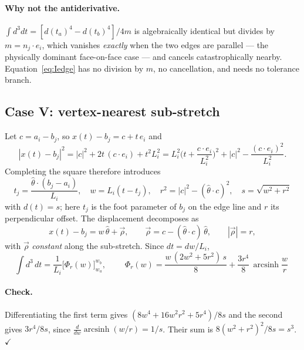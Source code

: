 \documentclass[11pt]{article}
\newcommand{\asinh}{\operatorname{arcsinh}}
\newcommand{\that}{\hat\theta}
\newcommand{\rvec}{\vec\rho}
\begin{document}
\paragraph{Why not the antiderivative.} $\int d^3dt = [d(t_a)^4 - d(t_b)^4]/4m$ is algebraically identical but divides by $m = n_j\cdot e_i$, which vanishes \emph{exactly} when the two edges are parallel --- the physically dominant face-on-face case --- and cancels catastrophically nearby. Equation~\eqref{eq:Iedge} has no division by $m$, no cancellation, and needs no tolerance branch.

\subsection{Case V: vertex-nearest sub-stretch}

Let $c = a_i - b_j$, so $x(t)-b_j = c + t\,e_i$ and
\begin{equation}
|x(t)-b_j|^2 = |c|^2 + 2t\,(c\cdot e_i) + t^2L_i^2
= L_i^2\Big(t + \frac{c\cdot e_i}{L_i^2}\Big)^2 + |c|^2 - \frac{(c\cdot e_i)^2}{L_i^2}.
\end{equation}
Completing the square therefore introduces
\begin{equation}
\boxed{\;t_j = \frac{\that\cdot(b_j-a_i)}{L_i}, \quad w = L_i(t-t_j), \quad
r^2 = |c|^2 - (\that\cdot c)^2, \quad s = \sqrt{w^2+r^2}\;}
\label{eq:quad}
\end{equation}
with $d(t) = s$; here $t_j$ is the foot parameter of $b_j$ on the edge line and $r$ its perpendicular offset. The displacement decomposes as
\begin{equation}
x(t)-b_j = w\,\that + \rvec, \qquad \rvec = c - (\that\cdot c)\,\that, \qquad |\rvec| = r,
\label{eq:decomp}
\end{equation}
with $\rvec$ \emph{constant} along the sub-stretch. Since $dt = dw/L_i$,
\begin{equation}
\int d^3\,dt = \frac{1}{L_i}\Big[\Phi_r(w)\Big]_{w_a}^{w_b}, \qquad
\boxed{\;\Phi_r(w) = \frac{w\,(2w^2+5r^2)\,s}{8} + \frac{3r^4}{8}\,\asinh\frac{w}{r}\;}
\label{eq:Ivert}
\end{equation}

\paragraph{Check.} Differentiating the first term gives $(8w^4+16w^2r^2+5r^4)/8s$ and the second gives $3r^4/8s$, since $\tfrac{d}{dw}\asinh(w/r) = 1/s$. Their sum is $8(w^2+r^2)^2/8s = s^3$. \quad$\checkmark$
\end{document}
